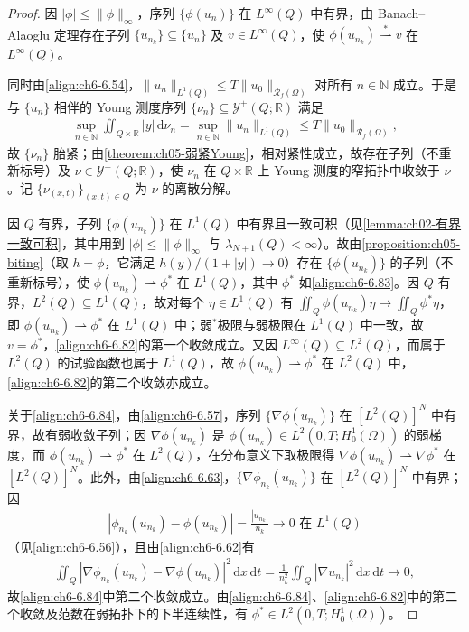 \documentclass[../../main.tex]{subfiles}%
\begin{document}
\begin{proof}
因 $|\phi|\leqslant\|\phi\|_\infty$，序列 $\{\phi(u_n)\}$ 在 $L^\infty(Q)$ 中有界，由 Banach--Alaoglu 定理存在子列 $\{u_{n_k}\}\subseteq\{u_n\}$ 及 $v\in L^\infty(Q)$，使 $\phi(u_{n_k})\stackrel{*}{\rightharpoonup}v$ 在 $L^\infty(Q)$。

同时由\eqref{align:ch6-6.54}，$\|u_n\|_{L^1(Q)}\leqslant T\|u_0\|_{\mathscr{R}_f(\Omega)}$ 对所有 $n\in\mathbb{N}$ 成立。于是与 $\{u_n\}$ 相伴的 Young 测度序列 $\{\nu_n\}\subseteq\mathcal{Y}^+(Q;\mathbb{R})$ 满足
\begin{align*}
\sup_{n\in\mathbb{N}}\iint_{Q\times\mathbb{R}}|y|\,\mathrm{d}\nu_n
=\sup_{n\in\mathbb{N}}\|u_n\|_{L^1(Q)}\leqslant T\|u_0\|_{\mathscr{R}_f(\Omega)},
\end{align*}
故 $\{\nu_n\}$ 胎紧；由\cref{theorem:ch05-弱紧Young}，相对紧性成立，故存在子列（不重新标号）及 $\nu\in\mathcal{Y}^+(Q;\mathbb{R})$，使 $\nu_n$ 在 $Q\times\mathbb{R}$ 上 Young 测度的窄拓扑中收敛于 $\nu$。记 $\{\nu_{(x,t)}\}_{(x,t)\in Q}$ 为 $\nu$ 的离散分解。

因 $Q$ 有界，子列 $\{\phi(u_{n_k})\}$ 在 $L^1(Q)$ 中有界且一致可积（见\cref{lemma:ch02-有界一致可积}，其中用到 $|\phi|\leqslant\|\phi\|_\infty$ 与 $\lambda_{N+1}(Q)<\infty$）。故由\cref{proposition:ch05-biting}（取 $h=\phi$，它满足 $h(y)/(1+|y|)\to0$）存在 $\{\phi(u_{n_k})\}$ 的子列（不重新标号），使 $\phi(u_{n_k})\rightharpoonup\phi^*$ 在 $L^1(Q)$，其中 $\phi^*$ 如\eqref{align:ch6-6.83}。因 $Q$ 有界，$L^2(Q)\subseteq L^1(Q)$，故对每个 $\eta\in L^1(Q)$ 有 $\iint_Q\phi(u_{n_k})\eta\to\iint_Q\phi^*\eta$，即 $\phi(u_{n_k})\rightharpoonup\phi^*$ 在 $L^1(Q)$ 中；弱$^*$极限与弱极限在 $L^1(Q)$ 中一致，故 $v=\phi^*$，\eqref{align:ch6-6.82}的第一个收敛成立。又因 $L^\infty(Q)\subseteq L^2(Q)$，而属于 $L^2(Q)$ 的试验函数也属于 $L^1(Q)$，故 $\phi(u_{n_k})\rightharpoonup\phi^*$ 在 $L^2(Q)$ 中，\eqref{align:ch6-6.82}的第二个收敛亦成立。

关于\eqref{align:ch6-6.84}，由\eqref{align:ch6-6.57}，序列 $\{\nabla\phi(u_{n_k})\}$ 在 $[L^2(Q)]^N$ 中有界，故有弱收敛子列；因 $\nabla\phi(u_{n_k})$ 是 $\phi(u_{n_k})\in L^2(0,T;H^1_0(\Omega))$ 的弱梯度，而 $\phi(u_{n_k})\rightharpoonup\phi^*$ 在 $L^2(Q)$，在分布意义下取极限得 $\nabla\phi(u_{n_k})\rightharpoonup\nabla\phi^*$ 在 $[L^2(Q)]^N$。此外，由\eqref{align:ch6-6.63}，$\{\nabla\phi_{n_k}(u_{n_k})\}$ 在 $[L^2(Q)]^N$ 中有界；因
\begin{align}
|\phi_{n_k}(u_{n_k})-\phi(u_{n_k})|=\frac{|u_{n_k}|}{n_k}\to0 \text{ 在 }L^1(Q) \label{align:ch6-6.90}
\end{align}
（见\eqref{align:ch6-6.56}），且由\eqref{align:ch6-6.62}有
\begin{align*}
\iint_Q\left|\nabla\phi_{n_k}(u_{n_k})-\nabla\phi(u_{n_k})\right|^2\,\mathrm{d}x\,\mathrm{d}t
=\frac{1}{n_k^2}\iint_Q|\nabla u_{n_k}|^2\,\mathrm{d}x\,\mathrm{d}t\to0,
\end{align*}
故\eqref{align:ch6-6.84}中第二个收敛成立。由\eqref{align:ch6-6.84}、\eqref{align:ch6-6.82}中的第二个收敛及范数在弱拓扑下的下半连续性，有 $\phi^*\in L^2(0,T;H^1_0(\Omega))$。


\end{proof}
\end{document}
